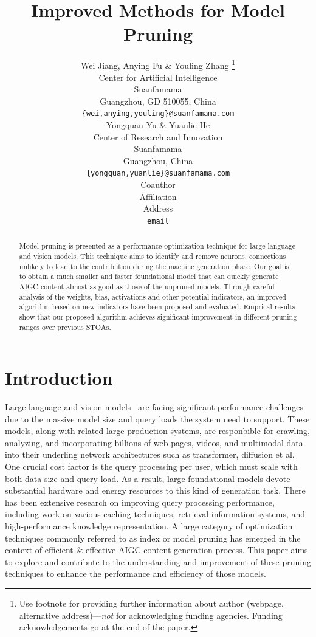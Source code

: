 \documentclass{article} %
\title{Improved Methods for Model Pruning}
\author{Wei Jiang, Anying Fu \& Youling Zhang \thanks{ Use footnote for providing further information
about author (webpage, alternative address)---\emph{not} for acknowledging
funding agencies.  Funding acknowledgements go at the end of the paper.} \\
Center for Artificial Intelligence\\
Suanfamama\\
Guangzhou, GD 510055, China \\
\texttt{\{wei,anying,youling\}@suanfamama.com} \\
\And
Yongquan Yu \& Yuanlie He \\
Center of Research and Innovation\\
Suanfamama\\
Guangzhou, China \\
\texttt{\{yongquan,yuanlie\}@suanfamama.com} \\
\AND
Coauthor \\
Affiliation \\
Address \\
\texttt{email}
}
\begin{document}
\maketitle

\begin{abstract}
Model pruning is presented as a performance optimization technique for large language and vision models. This technique aims to identify and remove neurons, connections unlikely to lead to the contribution during the machine generation phase. Our goal is to obtain a much smaller and faster foundational model that can quickly generate AIGC content almost as good as those of the unpruned models. Through careful analysis of the weights, bias, activations and other potential indicators, an improved algorithm based on new indicators have been proposed and evaluated. Emprical results show that our proposed algorithm achieves significant improvement in different pruning ranges over previous STOAs.
\end{abstract}

\section{Introduction}
\label{intro}
Large language and vision models~\citep{llm20, gpt4-23} are facing significant performance challenges due to the massive model size and query loads the system need to support. These models, along with related large production systems, are responbible for crawling, analyzing, and incorporating billions of web pages, videos, and multimodal data into their underling network architectures such as transformer, diffusion et al.
One crucial cost factor is the query processing per user, which must scale with both data size and query load. As a result, large foundational models devote substantial hardware and energy resources to this kind of generation task. There has been extensive research on improving query processing performance, including work on various caching techniques, retrieval information systems, and high-performance knowledge representation.
A large category of optimization techniques commonly referred to as index or model pruning has emerged in the context of efficient \& effective AIGC content generation process. This paper aims to explore and contribute to the understanding and improvement of these pruning techniques to enhance the performance and efficiency of those models.
\end{document}
